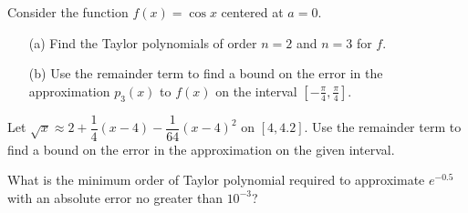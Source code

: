 \documentclass[12pt]{article}
\begin{document}
\newpage


\Example Consider the function $f(x)=\cos x$ centered at $a=0$. 

\begin{itemize}
\item[(a)] Find the Taylor polynomials of order $n=2$ and $n=3$ for $f$. 

\vfill

\item[(b)] Use the remainder term to find a bound on the error in the approximation $p_3(x)$ to $f(x)$ on the interval $\left[-\frac{\pi}{4},\frac{\pi}{4}\right]$.

\vfill
\end{itemize}

\newpage

\Example Let $\sqrt{x}\approx 2+\dfrac{1}{4}(x-4)-\dfrac{1}{64}(x-4)^2$ on $[4,4.2]$. Use the remainder term to find a bound on the error in the approximation on the given interval.

\vfill

\Example What is the minimum order of Taylor polynomial required to approximate $e^{-0.5}$ with an absolute error no greater than $10^{-3}$?

\vfill
\end{document}
